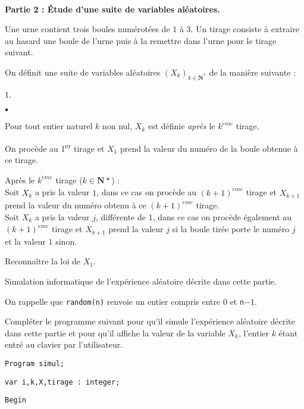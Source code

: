 \documentclass[11pt]{article}%
\begin{document}
\ 

\textbf{Partie 2 : Étude d'une suite de variables aléatoires.}

Une urne contient trois boules numérotées de $1$ à $3$. Un tirage
consiste à
extraire au hasard une boule de l'urne puis à la remettre dans l'urne
pour
le tirage suivant.

On définit une suite de variables aléatoires
$(X_{k})_{k\in{\mathbf{N}}^*}$
de la manière suivante :

\begin{noliste}{1.}
 \setlength{\itemsep}{4mm}
\item 
\begin{noliste}{$\scriptstyle \bullet$}
\item Pour tout entier naturel $k$ non nul, $X_{k}$ est définie
\emph{après}
le $k^{\grave{e}me}$ tirage.

\item On procède au 1\textsuperscript{er} tirage et $X_{1}$ prend la
valeur
du numéro de la boule obtenue à ce tirage.

\item Après le $k^{\grave{e}me}$ tirage ($k\in {\mathbf{N}}{\ast }$)
:\\
Soit $X_{k}$ a pris la valeur $1$, dans ce cas on procède au $(k +
1)^{\grave{e}me}$ tirage et $X_{k + 1}$ prend la valeur du numéro
obtenu à ce $(k + 1)^{\grave{e}me}$ tirage.\\
Soit $X_{k}$ a pris la valeur $j$, différente de $1$, dans ce cas on
procède 
également au $(k + 1)^{\grave{e}me}$ tirage et $X_{k + 1}$ prend la
valeur $j$
si la boule tirée porte le numéro $j$ et la valeur $1$ sinon.
\end{noliste}

\item Reconnaître la loi de $X_{1}$.

\item Simulation informatique de l'expérience aléatoire décrite dans
cette
partie.

On rappelle que \texttt{random(n)} renvoie un entier compris entre $0$
et 
\texttt{n}$-1$.

Compléter le programme suivant pour qu'il simule l'expérience aléatoire
décrite dans cette partie et pour qu'il affiche la valeur de la
variable $X_{k}
$, l'entier $k$ étant entré au clavier par l'utilisateur.

\texttt{Program\ simul;}

\texttt{var\ i,k,X,tirage\ :\ integer;}

\texttt{Begin}


\end{noliste}
\end{document}
